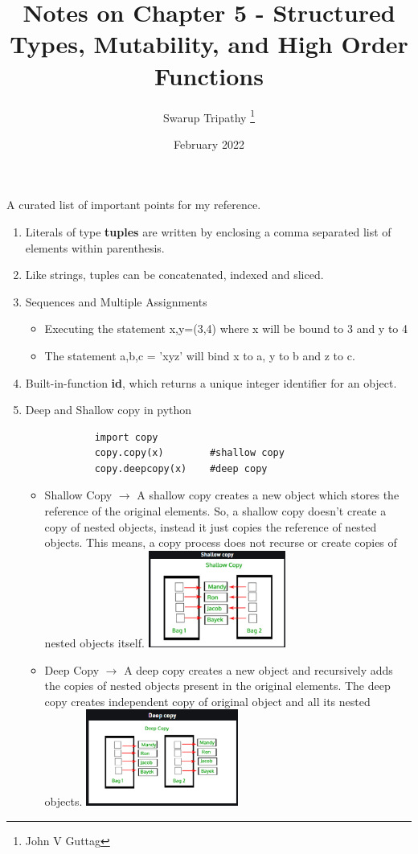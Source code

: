 \documentclass[11pt]{article}
\title{Notes on Chapter 5 - Structured Types, Mutability, and High Order Functions}
\author{Swarup Tripathy \thanks{John V Guttag}}
\date{February 2022}
\begin{document}
    \maketitle
    A curated list of important points for my reference.\\
    \begin{enumerate}
        \item Literals of type \textbf{tuples} are written by enclosing a comma separated list of elements within parenthesis.
        \item Like strings, tuples can be concatenated, indexed and sliced.
        \item Sequences and Multiple Assignments
        \begin{itemize}
            \item Executing the statement x,y=(3,4) where x will be bound to 3 and y to 4
            \item The statement a,b,c = 'xyz' will bind x to a, y to b and z to c.
        \end{itemize}
        \item Built-in-function \textbf{id}, which returns a unique integer identifier for an object.
        \item Deep and Shallow copy in python
        \begin{verbatim}
            import copy
            copy.copy(x)        #shallow copy
            copy.deepcopy(x)    #deep copy
        \end{verbatim}
        \begin{itemize}
            \item Shallow Copy $\rightarrow$ A shallow copy creates a new object which stores the reference of the original elements.
            So, a shallow copy doesn't create a copy of nested objects, instead it just copies the reference of nested objects. This means, a copy process does not recurse or create copies of nested objects itself.
            \centering
            \includegraphics[width=4.5cm]{imgs/2.png}

            \item Deep Copy $\rightarrow$ A deep copy creates a new object and recursively adds the copies of nested objects present in the original elements.
            The deep copy creates independent copy of original object and all its nested objects.
            \centering
            \includegraphics[width=5cm]{imgs/1.png}
        \end{itemize}
    \end{enumerate}
\end{document}
